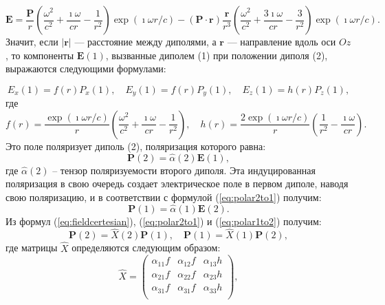 \begin{equation}
\textbf{E} = \frac{\textbf{P}}{r} \left( \frac{\omega ^2}{c^2} + \frac{\imath \omega}{c r} - \frac{1}{r^2} \right) \exp(\imath \omega r/c) - (\textbf{P} \cdot \textbf{r}) \frac{\textbf{r}}{r^3} \left( \frac{\omega ^2}{c^2} + \frac{3 \imath \omega}{c r} - \frac{3}{r^2} \right) \exp(\imath \omega r/c).
\label{eq:elecdipole}
\end{equation}
Значит, если $ \vert \textbf{r} \vert $ --- расстояние между диполями, а $ \textbf{r} $ --- направление вдоль оси $ Oz $, то компоненты $ \textbf{E}(1) $, вызванные диполем (1) при положении диполя (2), выражаются следующими формулами:

\begin{equation}
E_x (1) = f(r) P_x (1), \quad
E_y (1) = f(r) P_y (1), \quad
E_z (1) = h(r) P_z (1),
\label{eq:fieldcertesian}
\end{equation}
где
\begin{equation}
f(r) = \frac{\exp (\imath \omega r /c)}{r} \left( \frac{\omega ^2}{c^2} + \frac{\imath \omega}{c r} - \frac{1}{r^2} \right), \quad
h(r) = \frac{2 \exp (\imath \omega r /c)}{r} \left( \frac{1}{r^2} - \frac{\imath \omega}{c r} \right).
\label{eq:hf_functions}
\end{equation}
Это поле поляризует диполь (2), поляризация которого равна:
\begin{equation}
\textbf{P}(2) = \widehat{\alpha}(2) \textbf{E}(1),
\label{eq:polar2to1}
\end{equation}
где $ \widehat{\alpha} (2) $ -- тензор поляризуемости второго диполя. Эта индуцированная поляризация в свою очередь создает электрическое поле в первом диполе, наводя свою поляризацию, и в соответствии с формулой (\ref{eq:polar2to1}) получим:
\begin{equation}
\textbf{P}(1) = \widehat{\alpha}(1) \textbf{E}(2).
\label{eq:polar1to2}
\end{equation}
Из формул (\ref{eq:fieldcertesian}), (\ref{eq:polar2to1}) и (\ref{eq:polar1to2}) получим:
\begin{equation}
\textbf{P}(2) = \widehat{X}(2) \textbf{P}(1), \quad 
\textbf{P}(1) = \widehat{X}(1) \textbf{P}(2),
\label{eq:polarity}
\end{equation}
где матрицы $ \widehat{X} $ определяются следующим образом:
\begin{equation}
\widehat{X} = \left(
\begin{matrix}
\alpha _{11} f & \alpha _{12} f & \alpha _{13} h \\
\alpha _{21} f & \alpha _{22} f & \alpha _{23} h \\
\alpha _{31} f & \alpha _{31} f & \alpha _{33} h \\
\end{matrix}
\right),
\label{eq:Xmatrix}
\end{equation}
